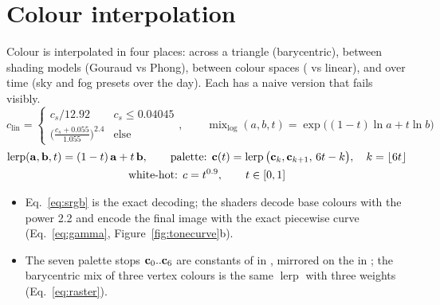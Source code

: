 \section{Colour interpolation}
\label{sec:color}
Colour is interpolated in four places: across a triangle (barycentric), between shading models (Gouraud vs Phong),
between colour spaces ( vs linear), and over time (sky and fog presets over the day). Each has a naive version
that fails visibly.
\begin{equation}
c_{\text{lin}}=\begin{cases}c_s/12.92 & c_s\le0.04045\\ \big(\frac{c_s+0.055}{1.055}\big)^{2.4} & \text{else}\end{cases},\qquad
\operatorname{mix}_{\log}(a,b,t)=\exp\big((1-t)\ln a+t\ln b\big)
\label{eq:srgb}
\end{equation}
\begin{gather}
\operatorname{lerp}(\mathbf{a},\mathbf{b},t)=(1-t)\,\mathbf{a}+t\,\mathbf{b},\qquad
\text{palette: } \mathbf{c}(t)=\operatorname{lerp}\big(\mathbf{c}_k,\mathbf{c}_{k+1},\,6t-k\big),\quad k=\lfloor6t\rfloor\label{eq:palette}\\
\text{white-hot: } c=t^{0.9},\qquad t\in[0,1]\nonumber
\end{gather}
\begin{itemize}
\item Eq.~\eqref{eq:srgb} is the exact  decoding; the shaders decode base colours with the power 2.2 and encode the
final image with the exact piecewise curve (Eq.~\eqref{eq:gamma}, Figure~\ref{fig:tonecurve}b).
\item The seven palette stops $\mathbf{c}_0..\mathbf{c}_6$ are constants of  in , mirrored
on the  in ; the barycentric mix of three vertex colours is the same $\operatorname{lerp}$ with three weights (Eq.~\eqref{eq:raster}).
\end{itemize}

